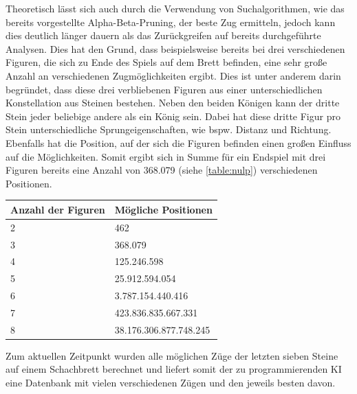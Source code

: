 Theoretisch lässt sich auch durch die Verwendung von Suchalgorithmen, wie das bereits vorgestellte Alpha-Beta-Pruning, der beste Zug ermitteln, jedoch kann dies deutlich länger dauern als das Zurückgreifen auf bereits durchgeführte Analysen. Dies hat den Grund, dass beispielsweise bereits bei drei verschiedenen Figuren, die sich zu Ende des Spiels auf dem Brett befinden, eine sehr große Anzahl an verschiedenen Zugmöglichkeiten ergibt. Dies ist unter anderem darin begründet, dass diese drei verbliebenen Figuren aus einer unterschiedlichen Konstellation aus Steinen bestehen. Neben den beiden Königen kann der dritte Stein jeder beliebige andere als ein König sein. Dabei hat diese dritte Figur pro Stein unterschiedliche Sprungeigenschaften, wie bspw. Distanz und Richtung. Ebenfalls hat die Position, auf der sich die Figuren befinden einen großen Einfluss auf die Möglichkeiten. Somit ergibt sich in Summe für ein Endspiel mit drei Figuren bereits eine Anzahl von 368.079 (siehe \ref{table:nulp}) verschiedenen Positionen.

\begin{center}
\begin{tabular}{| p{5cm} | p{5cm} |}
\hline
\textbf{Anzahl der Figuren} & \textbf{Mögliche Positionen}\\ \hline
2 & 462\\ \hline
3 & 368.079\\ \hline
4 & 125.246.598\\ \hline
5 & 25.912.594.054\\ \hline
6 & 3.787.154.440.416\\ \hline
7 & 423.836.835.667.331\\ \hline
8 & 38.176.306.877.748.245 \cite{Kryukov2014}\\
\hline
\end{tabular}
\label{table:nulp}
\end{center}

Zum aktuellen Zeitpunkt wurden alle möglichen Züge der letzten sieben Steine auf einem Schachbrett berechnet und liefert somit der zu programmierenden KI eine Datenbank mit vielen verschiedenen Zügen und den jeweils besten davon.


